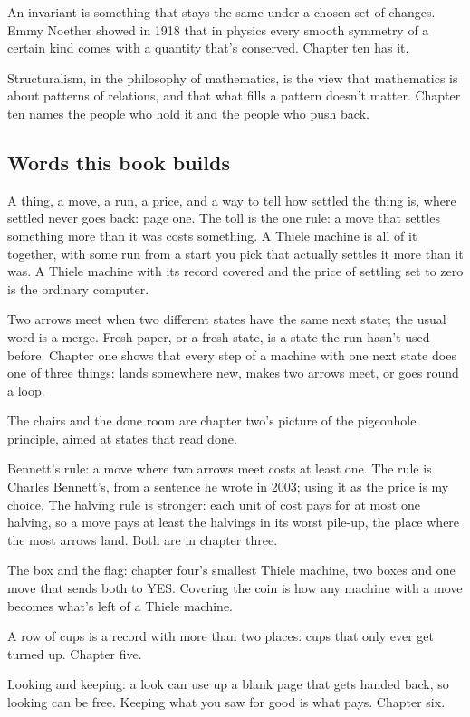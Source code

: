 \documentclass[11pt,twoside]{article}
\theoremstyle{thielethm}
\theoremstyle{thieledef}
\theoremstyle{thieledef}
\theoremstyle{thieledef}
\theoremstyle{thielethm}
\theoremstyle{thieleobs}
\theoremstyle{thielethm}
\begin{document}
An invariant is something that stays the same under a chosen set of changes. Emmy Noether showed in 1918 that in physics every smooth symmetry of a certain kind comes with a quantity that's conserved. Chapter ten has it.

Structuralism, in the philosophy of mathematics, is the view that mathematics is about patterns of relations, and that what fills a pattern doesn't matter. Chapter ten names the people who hold it and the people who push back.

\subsection{Words this book builds}

A thing, a move, a run, a price, and a way to tell how settled the thing is, where settled never goes back: page one. The toll is the one rule: a move that settles something more than it was costs something. A Thiele machine is all of it together, with some run from a start you pick that actually settles it more than it was. A Thiele machine with its record covered and the price of settling set to zero is the ordinary computer.

Two arrows meet when two different states have the same next state; the usual word is a merge. Fresh paper, or a fresh state, is a state the run hasn't used before. Chapter one shows that every step of a machine with one next state does one of three things: lands somewhere new, makes two arrows meet, or goes round a loop.

The chairs and the done room are chapter two's picture of the pigeonhole principle, aimed at states that read done.

Bennett's rule: a move where two arrows meet costs at least one. The rule is Charles Bennett's, from a sentence he wrote in 2003; using it as the price is my choice. The halving rule is stronger: each unit of cost pays for at most one halving, so a move pays at least the halvings in its worst pile-up, the place where the most arrows land. Both are in chapter three.

The box and the flag: chapter four's smallest Thiele machine, two boxes and one move that sends both to YES. Covering the coin is how any machine with a move becomes what's left of a Thiele machine.

A row of cups is a record with more than two places: cups that only ever get turned up. Chapter five.

Looking and keeping: a look can use up a blank page that gets handed back, so looking can be free. Keeping what you saw for good is what pays. Chapter six.
\end{document}
